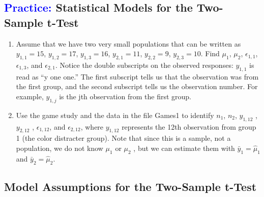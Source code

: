 \documentclass[
]{report}
\begin{document}
\hypertarget{statistical-models-for-the-two-sample-t-test}{%
\subsection*{\texorpdfstring{\textcolor{blue}{Practice:} Statistical Models for the Two-Sample t-Test}{ Statistical Models for the Two-Sample t-Test}}\label{statistical-models-for-the-two-sample-t-test}}

\begin{enumerate}
\def\labelenumi{\arabic{enumi}.}
\setcounter{enumi}{4}
\item
  Assume that we have two very small populations that can be written as
  \(\scriptstyle y_{1,1} = 15\), \(\scriptstyle y_{1,2} = 17\), \(\scriptstyle y_{1,3} = 16\), \(\scriptstyle y_{2,1} = 11\), \(\scriptstyle y_{2,2} = 9\), \(\scriptstyle y_{2,3} = 10\). Find \(\scriptstyle \mu_1\), \(\scriptstyle \mu_2\), \(\scriptstyle \epsilon_{1, 1}\), \(\scriptstyle \epsilon_{1, 3}\), and \(\scriptstyle \epsilon_{2, 1}\). Notice the double subscripts on the observed responses: \(\scriptstyle y_{1,1}\) is read as ``y one one.'' The first subscript tells us that the observation was from the first group, and the second subscript tells us the observation number. For example, \(\scriptstyle y_{1,j}\) is the jth observation from the first group.
\item
  Use the game study and the data in the file Games1 to identify \(\scriptstyle n_1\), \(\scriptstyle n_2\), \(\scriptstyle y_{1,12}\) , \(\scriptstyle y_{2,12}\) , \(\scriptstyle \epsilon_{1, 12}\), and \(\scriptstyle \epsilon_{2, 12}\),
  where \(\scriptstyle y_{1,12}\) represents the 12th observation from group 1 (the color distracter group). Note that since this is a sample, not a population, we do not know \(\scriptstyle \mu_1\) or \(\scriptstyle \mu_2\) , but we can estimate them with \(\scriptstyle \bar{y}_1 = \hat{\mu}_1\) and \(\scriptstyle \bar{y}_2 = \hat{\mu}_2\).
\end{enumerate}

\hypertarget{model-assumptions-for-the-two-sample-t-test}{%
\subsection*{Model Assumptions for the Two-Sample t-Test}\label{model-assumptions-for-the-two-sample-t-test}}
\end{document}

